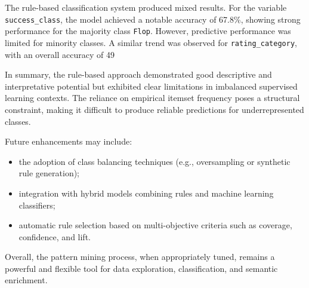 \documentclass{article}
\begin{document}
The rule-based classification system produced mixed results. For the variable \texttt{success\_class}, the model achieved a notable accuracy of 67.8\%, showing strong performance for the majority class \texttt{Flop}. However, predictive performance was limited for minority classes. A similar trend was observed for \texttt{rating\_category}, with an overall accuracy of 49%

In summary, the rule-based approach demonstrated good descriptive and interpretative potential but exhibited clear limitations in imbalanced supervised learning contexts. The reliance on empirical itemset frequency poses a structural constraint, making it difficult to produce reliable predictions for underrepresented classes.

Future enhancements may include:
\begin{itemize}
\item the adoption of class balancing techniques (e.g., oversampling or synthetic rule generation);
\item integration with hybrid models combining rules and machine learning classifiers;
\item automatic rule selection based on multi-objective criteria such as coverage, confidence, and lift.
\end{itemize}

Overall, the pattern mining process, when appropriately tuned, remains a powerful and flexible tool for data exploration, classification, and semantic enrichment.
\end{document}
